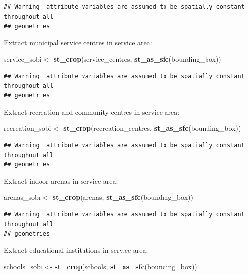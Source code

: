 \documentclass[
]{article}
\newenvironment{Shaded}{\begin{snugshade}}{\end{snugshade}}
\newcommand{\KeywordTok}[1]{\textcolor[rgb]{0.13,0.29,0.53}{\textbf{#1}}}
\newcommand{\NormalTok}[1]{#1}
\newcommand{\StringTok}[1]{\textcolor[rgb]{0.31,0.60,0.02}{#1}}
\begin{document}
\begin{verbatim}
## Warning: attribute variables are assumed to be spatially constant throughout all
## geometries
\end{verbatim}

Extract municipal service centres in service area:

\begin{Shaded}
\begin{Highlighting}[]
\NormalTok{service_sobi <-}\StringTok{ }\KeywordTok{st_crop}\NormalTok{(service_centres, }\KeywordTok{st_as_sfc}\NormalTok{(bounding_box))}
\end{Highlighting}
\end{Shaded}

\begin{verbatim}
## Warning: attribute variables are assumed to be spatially constant throughout all
## geometries
\end{verbatim}

Extract recreation and community centres in service area:

\begin{Shaded}
\begin{Highlighting}[]
\NormalTok{recreation_sobi <-}\StringTok{ }\KeywordTok{st_crop}\NormalTok{(recreation_centres, }\KeywordTok{st_as_sfc}\NormalTok{(bounding_box))}
\end{Highlighting}
\end{Shaded}

\begin{verbatim}
## Warning: attribute variables are assumed to be spatially constant throughout all
## geometries
\end{verbatim}

Extract indoor arenas in service area:

\begin{Shaded}
\begin{Highlighting}[]
\NormalTok{arenas_sobi <-}\StringTok{ }\KeywordTok{st_crop}\NormalTok{(arenas, }\KeywordTok{st_as_sfc}\NormalTok{(bounding_box))}
\end{Highlighting}
\end{Shaded}

\begin{verbatim}
## Warning: attribute variables are assumed to be spatially constant throughout all
## geometries
\end{verbatim}

Extract educational institutions in service area:

\begin{Shaded}
\begin{Highlighting}[]
\NormalTok{schools_sobi <-}\StringTok{ }\KeywordTok{st_crop}\NormalTok{(schools, }\KeywordTok{st_as_sfc}\NormalTok{(bounding_box))}
\end{Highlighting}
\end{Shaded}
\end{document}
